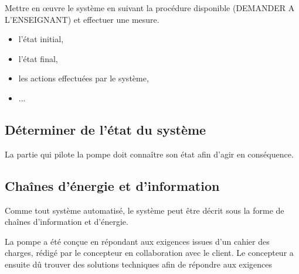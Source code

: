
Mettre en \oe uvre le système en suivant la procédure disponible (DEMANDER A L'ENSEIGNANT) et effectuer une mesure.


\begin{itemize}
 \item l'état initial,
 \item l'état final,
 \item les actions effectuées par le système,
 \item ...
\end{itemize}

\subsection{Déterminer de l'état du système}

La partie qui pilote la pompe doit connaître son état afin d'agir en conséquence. 



\subsection{Chaînes d'énergie et d'information}

Comme tout système automatisé, le système peut être décrit sous la forme de chaînes d'information et d'énergie.


La pompe a été conçue en répondant aux exigences issues d'un cahier des charges, rédigé par le concepteur en collaboration avec le client. Le concepteur a ensuite dû trouver des solutions techniques afin de répondre aux exigences 

